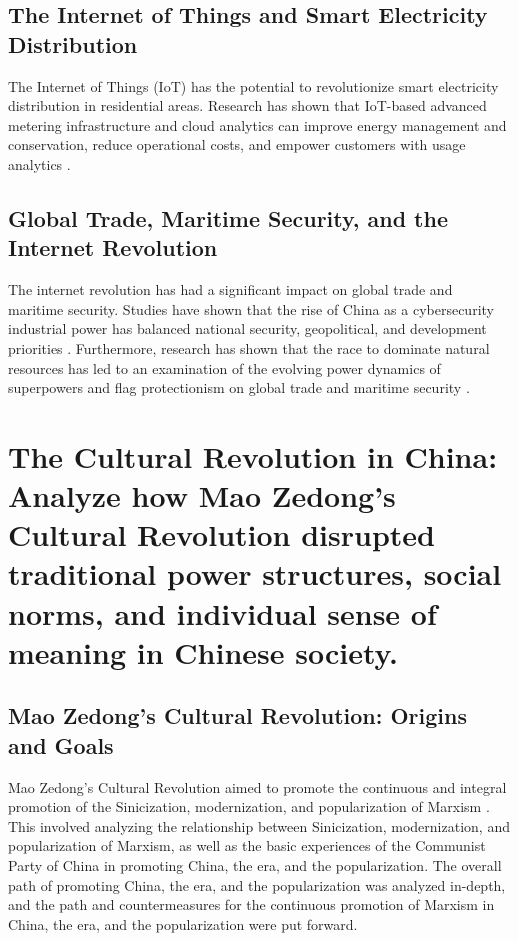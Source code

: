 \documentclass{article}
\begin{document}
\subsection{The Internet of Things and Smart Electricity Distribution}

The Internet of Things (IoT) has the potential to revolutionize smart electricity distribution in residential areas. Research has shown that IoT-based advanced metering infrastructure and cloud analytics can improve energy management and conservation, reduce operational costs, and empower customers with usage analytics \cite{Ramakrishnan2016SmartED}.

\subsection{Global Trade, Maritime Security, and the Internet Revolution}

The internet revolution has had a significant impact on global trade and maritime security. Studies have shown that the rise of China as a cybersecurity industrial power has balanced national security, geopolitical, and development priorities \cite{Cheung2018TheRO}. Furthermore, research has shown that the race to dominate natural resources has led to an examination of the evolving power dynamics of superpowers and flag protectionism on global trade and maritime security \cite{Manole2020UnderWF}.


\section{The Cultural Revolution in China: Analyze how Mao Zedong's Cultural Revolution disrupted traditional power structures, social norms, and individual sense of meaning in Chinese society.}

\subsection{Mao Zedong's Cultural Revolution: Origins and Goals}

Mao Zedong's Cultural Revolution aimed to promote the continuous and integral promotion of the Sinicization, modernization, and popularization of Marxism \cite{Wang2019BriefSO}. This involved analyzing the relationship between Sinicization, modernization, and popularization of Marxism, as well as the basic experiences of the Communist Party of China in promoting China, the era, and the popularization. The overall path of promoting China, the era, and the popularization was analyzed in-depth, and the path and countermeasures for the continuous promotion of Marxism in China, the era, and the popularization were put forward.
\end{document}
